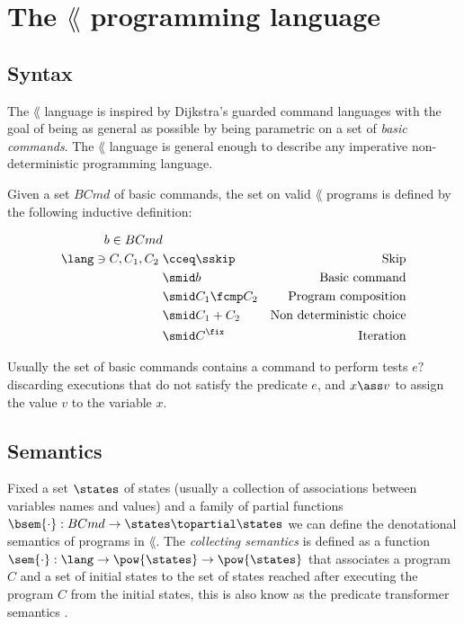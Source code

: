 \section{The $\lang$ programming language}

\subsection{Syntax}

The $\lang$ language is inspired by Dijkstra's guarded command languages
\cite{Dijkstra74} with the goal of being as general as possible by being
parametric on a set of \textit{basic commands}. The $\lang$ language is general
enough to describe any imperative non-deterministic programming language.

\begin{definition}
  Given a set $BCmd$ of basic commands, the set on valid $\lang$ programs is 
  defined by the following inductive definition:

  \begin{align*}
    b \in BCmd \\
    \lang \ni C, C_1, C_2 \; & \cceq \sskip        & \text{Skip}\\
                             & \smid b             & \text{Basic command}\\
                             & \smid C_1 \fcmp C_2 & \text{Program composition}\\
                             & \smid C_1 + C_2     & \text{Non deterministic choice}\\
                             & \smid C^\fix        & \text{Iteration}\\
  \end{align*}

  \begin{example} \label{exmp:base-commands-syntax}
    Usually the set of basic commands contains a command to perform tests $e ?$
    discarding executions that do not satisfy the predicate $e$, and $x \ass v$
    to assign the value $v$ to the variable $x$.
  \end{example}
\end{definition}


\subsection{Semantics}

Fixed a set $\states$ of states (usually a collection of associations between
variables names and values) and a family of partial functions $\bsem{\cdot} :
BCmd \to \states \topartial \states$ we can define the denotational semantics
of programs in $\lang$. The \textit{collecting semantics} is defined as a function
$\sem{\cdot} : \lang \to \pow{\states} \to \pow{\states}$ that associates a
program $C$ and a set of initial states to the set of states reached after
executing the program $C$ from the initial states, this is also know as the
predicate transformer semantics \cite{Dijkstra74}.

